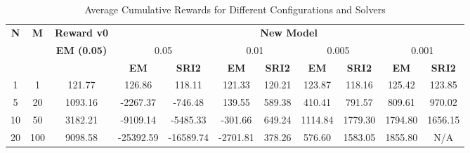 
\begin{table}[ht]
\centering
\caption{Average Cumulative Rewards for Different Configurations and Solvers}
\begin{tabular}{cc|c|cccccccc}
\toprule
\multirow{2}{*}{\textbf{N}} & \multirow{2}{*}{\textbf{M}} & \textbf{Reward v0} & \multicolumn{8}{c}{\textbf{New Model}} \\
\cmidrule(lr){3-11}
 &  & \textbf{EM (0.05)} & \multicolumn{2}{c}{0.05} & \multicolumn{2}{c}{0.01} & \multicolumn{2}{c}{0.005} & \multicolumn{2}{c}{0.001} \\
\cmidrule(lr){4-11}
 &  &  & \textbf{EM} & \textbf{SRI2} & \textbf{EM} & \textbf{SRI2} & \textbf{EM} & \textbf{SRI2} & \textbf{EM} & \textbf{SRI2} \\
\midrule
1 & 1 & 121.77 & 126.86 & 118.11 & 121.33 & 120.21 & 123.87 & 118.16 & 125.42 & 123.85 \\
5 & 20 & 1093.16 & -2267.37 & -746.48 & 139.55 & 589.38 & 410.41 & 791.57 & 809.61 & 970.02 \\
10 & 50 & 3182.21 & -9109.14 & -5485.33 & -301.66 & 649.24 & 1114.84 & 1779.30 & 1794.80 & 1656.15 \\
20 & 100 & 9098.58 & -25392.59 & -16589.74 & -2701.81 & 378.26 & 576.60 & 1583.05 & 1855.80 & N/A \\
\bottomrule
\end{tabular}
\label{tab:avg_rewards}
\end{table}
